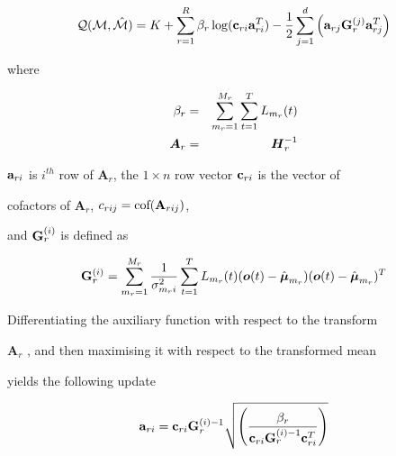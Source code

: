 \begin{eqnarray}


{\cal Q}({\cal M},{\hat{\cal M}}) = K + 


\sum_{r=1}^R


\beta_r\log({\bf c}_{ri}{\bf a}_{ri}^T)-


\frac{1}{2}


\sum_{j=1}^d{


\left({\bf a}_{rj}{\bf G}^{(j)}_r{\bf a}^T_{rj}


\right)} \nonumber


\end{eqnarray}


where 


\begin{eqnarray}


\beta_r &=& \sum_{m_r=1}^{M_r}\sum_{t=1}^T\like\\


{\bm A}_r &=& {\bm H}_r^{-1}


\end{eqnarray}


${\bf a}_{ri}$ is $i^{th}$ row of ${\bm


A}_r$, the $1\times n$ row vector ${\bf c}_{ri}$ is the vector of


cofactors of ${\bm A}_r$, $c_{rij}={\mbox{cof}}({\bf A}_{rij})$,


and  ${\bf G}^{(i)}_r$ is defined as


\begin{eqnarray}


{\bf G}^{(i)}_r=\sum_{m_r=1}^{M_r}


\frac{1}{\sigma_{m_ri}^{2}}


\sum_{t=1}^T\like(\bm{o}(t)-\hat{\bm{\mu}}_{m_r})


(\bm{o}(t)-\hat{\bm{\mu}}_{m_r})^T


\label{eq:gi_mllr2}


\end{eqnarray}


Differentiating the auxiliary function with respect to the transform


${\bm A}_r$ , and then maximising it with respect to the transformed mean


yields the following update


\begin{eqnarray}


{\bf a}_{ri} ={\bf c}_{ri}{\bf G}^{(i)-1}_r


\sqrt{\left(\frac{\beta_r}{{\bf


c}_{ri}{\bf G}_r^{(i)-1}{\bf c}^T_{ri}}\right)}


\end{eqnarray}


